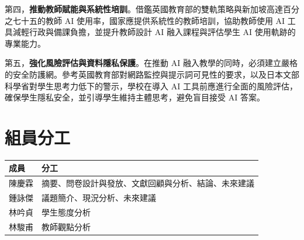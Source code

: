 第四，\textbf{推動教師賦能與系統性培訓}。借鑑英國教育部的雙軌策略\cite{dfe2023genai}與新加坡高達百分之七十五的教師 AI 使用率\cite{moe2025singapore}，國家應提供系統性的教師培訓，協助教師使用 AI 工具減輕行政與備課負擔，並提升教師設計 AI 融入課程與評估學生 AI 使用軌跡的專業能力。

第五，\textbf{強化風險評估與資料隱私保護}。在推動 AI 融入教學的同時，必須建立嚴格的安全防護網。參考英國教育部對網路監控與提示詞可見性的要求\cite{dfe2023genai}，以及日本文部科學省對學生思考力低下的警示\cite{mext2024genai}，學校在導入 AI 工具前應進行全面的風險評估，確保學生隱私安全，並引導學生維持主體思考，避免盲目接受 AI 答案。

\section{組員分工}\label{sec:組員分工}

\begin{longtable}{ll}
\toprule
成員 & 分工 \\
\midrule
陳慶霖 & 摘要、問卷設計與發放、文獻回顧與分析、結論、未來建議 \\
鍾詠傑 & 議題簡介、現況分析、未來建議 \\
林吟貞 & 學生態度分析 \\
林駿甫 & 教師觀點分析 \\
\bottomrule
\end{longtable}

\printbibliography[segment=\the\value{refsegment},title=參考文獻,heading=subbibliography]
